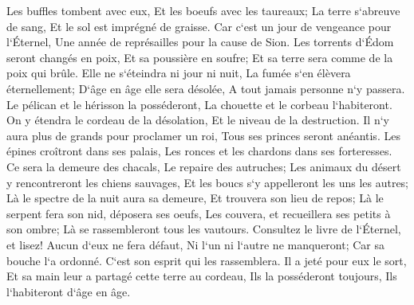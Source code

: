 \verse Les buffles tombent avec eux, Et les boeufs avec les taureaux; La terre s`abreuve de sang, Et le sol est imprégné de graisse. 
\verse Car c`est un jour de vengeance pour l`Éternel, Une année de représailles pour la cause de Sion. 
\verse Les torrents d`Édom seront changés en poix, Et sa poussière en soufre; Et sa terre sera comme de la poix qui brûle. 
\verse Elle ne s`éteindra ni jour ni nuit, La fumée s`en élèvera éternellement; D`âge en âge elle sera désolée, A tout jamais personne n`y passera. 
\verse Le pélican et le hérisson la posséderont, La chouette et le corbeau l`habiteront. On y étendra le cordeau de la désolation, Et le niveau de la destruction. 
\verse Il n`y aura plus de grands pour proclamer un roi, Tous ses princes seront anéantis. 
\verse Les épines croîtront dans ses palais, Les ronces et les chardons dans ses forteresses. Ce sera la demeure des chacals, Le repaire des autruches; 
\verse Les animaux du désert y rencontreront les chiens sauvages, Et les boucs s`y appelleront les uns les autres; Là le spectre de la nuit aura sa demeure, Et trouvera son lieu de repos; 
\verse Là le serpent fera son nid, déposera ses oeufs, Les couvera, et recueillera ses petits à son ombre; Là se rassembleront tous les vautours. 
\verse Consultez le livre de l`Éternel, et lisez! Aucun d`eux ne fera défaut, Ni l`un ni l`autre ne manqueront; Car sa bouche l`a ordonné. C`est son esprit qui les rassemblera. 
\verse Il a jeté pour eux le sort, Et sa main leur a partagé cette terre au cordeau, Ils la posséderont toujours, Ils l`habiteront d`âge en âge. 


